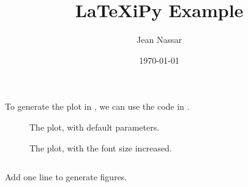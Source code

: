 \documentclass[10pt]{article}
\title{\LaTeX iPy Example}
\author{Jean Nassar}
\date{\today}
\begin{document}
\maketitle
To generate the plot in , we can use the code in .

\begin{figure}[h]
  \centering
  
  \caption{The plot, with default parameters.}
  \label{fig:sincos_defaults}
\end{figure}

\begin{figure}[h]
  \centering
  
  \caption{The plot, with the font size increased.}
  \label{fig:sincos_big_font}
\end{figure}

\begin{listing}[ht]
  \inputminted[firstline=7, lastline=10]{python}{example.py}
  \caption{Add one line to generate figures.}
  \label{lst:running}
\end{listing}
\end{document}

